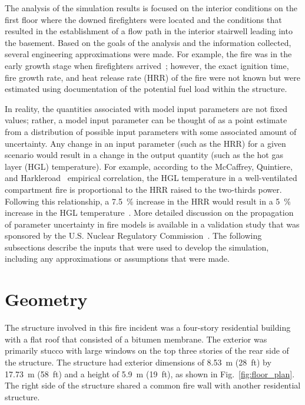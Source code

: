 \documentclass[12pt,oneside]{book}
\begin{document}
The analysis of the simulation results is focused on the interior conditions on the first floor where the downed firefighters were located and the conditions that resulted in the establishment of a flow path in the interior stairwell leading into the basement. Based on the goals of the analysis and the information collected, several engineering approximations were made. For example, the fire was in the early growth stage when firefighters arrived~\cite{NIOSH:Bowyer2}; however, the exact ignition time, fire growth rate, and heat release rate (HRR) of the fire were not known but were estimated using documentation of the potential fuel load within the structure.

In reality, the quantities associated with model input parameters are not fixed values; rather, a model input parameter can be thought of as a point estimate from a distribution of possible input parameters with some associated amount of uncertainty. Any change in an input parameter (such as the HRR) for a given scenario would result in a change in the output quantity (such as the hot gas layer (HGL) temperature). For example, according to the McCaffrey, Quintiere, and Harkleroad~\cite{SFPE:Walton} empirical correlation, the HGL temperature in a well-ventilated compartment fire is proportional to the HRR raised to the two-thirds power. Following this relationship, a 7.5~\% increase in the HRR would result in a 5~\% increase in the HGL temperature~\cite{NUREG_1824_Sup_1}. More detailed discussion on the propagation of parameter uncertainty in fire models is available in a validation study that was sponsored by the U.S. Nuclear Regulatory Commission~\cite{NUREG_1824_Sup_1}. The following subsections describe the inputs that were used to develop the simulation, including any approximations or assumptions that were made.

\section{Geometry}
\label{sec:geometry}

The structure involved in this fire incident was a four-story residential building with a flat roof that consisted of a bitumen membrane. The exterior was primarily stucco with large windows on the top three stories of the rear side of the structure. The structure had exterior dimensions of 8.53~m (28~ft) by 17.73~m (58~ft) and a height of 5.9~m (19~ft), as shown in Fig.~\ref{fig:floor_plan}. The right side of the structure shared a common fire wall with another residential structure.
\end{document}

